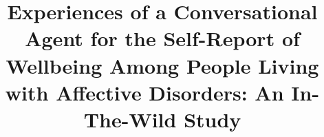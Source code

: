 \documentclass[acmsmall]{acmart}
\begin{document}









\title[A CA for the Self-Report of Wellbeing Among People Living with AD]{Experiences of a Conversational Agent for the Self-Report of Wellbeing Among People Living with Affective Disorders: An In-The-Wild Study}



%
\end{document}

